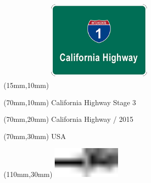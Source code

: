 \null\newpage
\begin{textblock*}{50mm}(15mm,10mm)%
\includegraphics[width=50mm]{LG/CAL.png}
\end{textblock*}
\begin{textblock*}{130mm}(70mm,10mm)%
{\fontsize{20}{20}\selectfont California Highway Stage 3}\\
\end{textblock*}
\begin{textblock*}{120mm}(70mm,20mm)%
{\fontsize{16}{16}\selectfont California Highway / 2015}\\
\end{textblock*}
\begin{textblock*}{120mm}(70mm,30mm)%
{\fontsize{12}{12}\selectfont USA}
\end{textblock*}
\begin{textblock*}{30mm}(110mm,30mm)%
\centering
\includegraphics[height=15mm]{icons/tofinish.pdf}
\end{textblock*}
